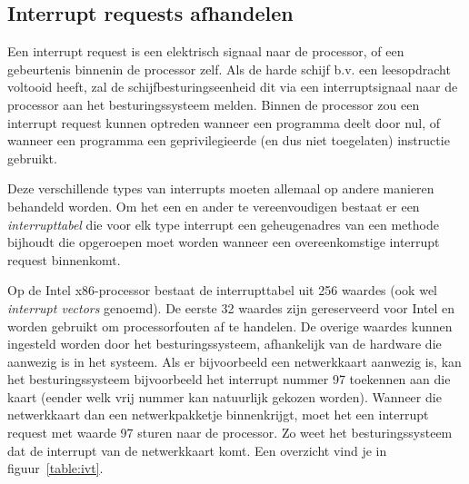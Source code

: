 \subsection{Interrupt requests afhandelen}

Een interrupt request is een elektrisch signaal naar de processor, of
een gebeurtenis binnenin de processor zelf. Als de harde schijf b.v.
een leesopdracht voltooid heeft, zal de schijfbesturingseenheid dit
via een interruptsignaal naar de processor aan het besturingssysteem
melden. Binnen de processor zou een interrupt request kunnen optreden wanneer
een programma deelt door nul, of wanneer een programma een
geprivilegieerde (en dus niet toegelaten) instructie gebruikt.

Deze verschillende types van interrupts moeten allemaal op andere manieren behandeld worden. Om het een en ander te vereenvoudigen bestaat er een \emph{interrupttabel} die voor elk type interrupt een geheugenadres van een methode bijhoudt die opgeroepen moet worden wanneer een overeenkomstige interrupt request binnenkomt.

Op de Intel x86-processor bestaat de interrupttabel uit 256 waardes (ook wel \emph{interrupt vectors} genoemd). De eerste 32 waardes zijn gereserveerd voor Intel en worden gebruikt om processorfouten af te handelen. De overige waardes kunnen ingesteld worden door het besturingssysteem, afhankelijk van de hardware die aanwezig is in het systeem. Als er bijvoorbeeld een netwerkkaart aanwezig is, kan het besturingssysteem bijvoorbeeld het interrupt nummer 97 toekennen aan die kaart (eender welk vrij nummer kan natuurlijk gekozen worden). Wanneer die netwerkkaart dan een netwerkpakketje binnenkrijgt, moet het een interrupt request met waarde 97 sturen naar de processor. Zo weet het besturingssysteem dat de interrupt van de netwerkkaart komt. Een overzicht vind je in figuur~\ref{table:ivt}.

